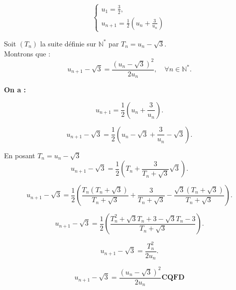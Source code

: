 \documentclass{article}
\begin{document}
\[
\begin{cases}
u_1 = \frac{3}{2}, \\
u_{n+1} = \frac{1}{2}\left(u_{n}+\frac{3}{u_{n}} \right) 
\end{cases}
\]

Soit $(T_{n})$ la suite définie sur $\mathbb{N}^{*}$ par $ T_{n} = u_{n} - \sqrt{3} $.\\
Montrons que :
\[
u_{n+1} - \sqrt{3} = \frac{(u_{n} - \sqrt{3})^2}{2u_{n}}, \quad \forall n \in \mathbb{N}^{*}.
\]

\textbf{On a :}

\[
u_{n+1} = \frac{1}{2} \left( u_n + \frac{3}{u_n} \right).
\]


\[
u_{n+1} - \sqrt{3} = \frac{1}{2} \left( u_n - \sqrt{3} + \frac{3}{u_n} - \sqrt{3} \right).
\]

En posant $T_n = u_n - \sqrt{3}$
\[
u_{n+1} - \sqrt{3} = \frac{1}{2} \left( T_n + \frac{3}{T_n+\sqrt{3}}\sqrt{3} \right).
\]

\[
u_{n+1} - \sqrt{3} = \frac{1}{2} \left( \frac{T_n(T_n+\sqrt{3})}{T_n+\sqrt{3}} + \frac{3}{T_n+\sqrt{3}}-\frac{\sqrt{3}(T_n+\sqrt{3})}{T_n+\sqrt{3}} \right).
\]

\[
u_{n+1} - \sqrt{3} = \frac{1}{2} \left( \frac{T_n^{2}+\sqrt{3}T_n + 3 -\sqrt{3}T_n  -3}{T_n+\sqrt{3}}\right).
\]


\[
u_{n+1} - \sqrt{3} = \frac{T_n^2}{2u_n}.
\]


\[
u_{n+1} - \sqrt{3} = \frac{(u_n - \sqrt{3})^2}{2u_n} \textbf{CQFD}
\]
\end{document}

